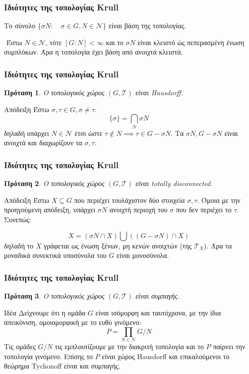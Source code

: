 \documentclass{beamer}
\newcommand {\tl}{\textlatin}
\newtheorem{prop}{Πρόταση}
\begin{document}
\begin{frame}
    \frametitle{Ιδιότητες της τοπολογίας \tl{Krull}}
    Το σύνολο $\{\sigma N: \quad \sigma \in G, N \in \mathcal N\}$ είναι βάση της τοπολογίας.
    \pause
    
    $ $\newline
    Έστω $N \in \mathcal N$, τότε $[G:N]<\infty$ και το $\sigma N$ είναι κλειστό ώς πεπερασμένη ένωση συμπλόκων. Άρα η τοπολογία έχει βάση από ανοιχτά κλειστά.
\end{frame}


\begin{frame}
    \frametitle{Ιδιότητες της τοπολογίας \tl{Krull}}
    \begin{prop}
    Ο τοπολογικός χώρος $(G,\mathcal T)$ είναι \tl{Hausdorff}.
    \end{prop}
    \pause
    \begin{block}{Απόδειξη}
    Έστω $\sigma , \tau \in G, \sigma \neq \tau$.
$$\{\sigma \} = \bigcap_N \sigma N$$
δηλαδή υπάρχει $N \in \mathcal{N}$ έτσι ώστε $\tau \notin N \implies \tau \in G-\sigma N$. Τα $\sigma N , G-\sigma N$ είναι ανοιχτά και διαχωρίζουν τα $\sigma , \tau$.
    \end{block}
\end{frame}




\begin{frame}
    \frametitle{Ιδιότητες της τοπολογίας \tl{Krull}}
    \begin{prop}
     Ο τοπολογικός χώρος $(G, \mathcal{T})$ είναι \tl{totally disconnected}.
    \end{prop}
    \pause
    \begin{block}{Απόδειξη}
     Έστω $X\subseteq G$ που περιέχει τουλάχιστον δύο στοιχεία $\sigma ,\tau$. Όμοια με την προηγούμενη απόδειξη, υπάρχει $\sigma N$ ανοιχτή περιοχή του $\sigma$ που δεν περιέχει το $\tau$. Συνεπώς:

    $$X = \left( \sigma N \cap X \right) \bigcup \left( \left( G-\sigma N\right) \cap X\right)$$
    δηλαδή το $X$ γράφεται ως ένωση ξένων, μη κενών ανοιχτών (της $\mathcal{T}_X$). Άρα τα μοναδικά συνεκτικά υποσύνολα του $G$ είναι μονοσύνολα.
    \end{block}
\end{frame}

\begin{frame}
    \frametitle{Ιδιότητες της τοπολογίας \tl{Krull}}
    \begin{prop}O τοπολογικός χώρος $(G, \mathcal{T})$ είναι συμπαγής.
    \end{prop}
    \pause
    \begin{block}{Ιδέα}
    Δείχνουμε ότι η ομάδα $G$ είναι ισόμορφη και ταυτόχρονα, με την ίδια απεικόνιση, ομοιομορφική με το ευθύ γινόμενο:
    $$P = \prod\limits_{N \in \mathcal{N}} G/N$$
    Τις ομάδες $G/N$ τις εμπλουτίζουμε με την διακριτή τοπολογία και το $P$ παίρνει την τοπολογία γινόμενο. Επίσης το $P$ είναι χώρος \tl{Hausdorff}  και επικαλούμενοι το θεώρημα \tl{Tychonoff} είναι και συμπαγής.
    \end{block}

\end{frame}
\end{document}

